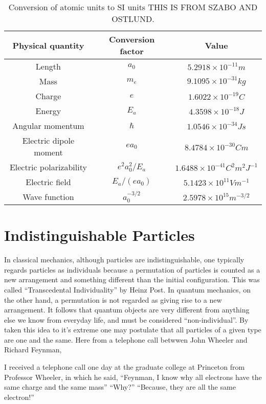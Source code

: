         \begin{table}
            \centering
            \caption{Conversion of atomic units to SI units THIS IS FROM SZABO AND OSTLUND.}
            \begin{tabular}{ccc} \hline
                Physical quantity & Conversion factor & Value \\ \hline
                Length  & $a_0$ & $5.2918 \times 10^{-11} m$ \\
                Mass    & $m_e$ & $9.1095 \times 10^{-31} kg$ \\
                Charge  & $e$   & $1.6022 \times 10^{-19} C$ \\
                Energy  & $E_a$ & $4.3598 \times 10^{-18} J$ \\
                Angular momentum & $\hbar$ &  $1.0546 \times 10^{-34} Js$ \\
                Electric dipole moment & $ea_0$& $8.4784 \times 10^{-30} Cm$ \\
                Electric polarizability & $e^2a_0^2/E_a$ & $1.6488 \times 10^{-41} C^2m^2J^{-1}$ \\
                Electric field & $E_a/(ea_0)$ & $5.1423 \times 10^{11} Vm^{-1} $ \\
                Wave function & $a_0^{-3/2}$ & $2.5978 \times 10^{15} m^{-3/2}$ \\ \hline
            \end{tabular}
            \label{tab:atomic_units_conversion}
        \end{table}


    \section{Indistinguishable Particles}

        In classical mechanics, although particles are indistinguishable, one typically
        regards particles as individuals because a permutation of particles is counted as
        a new arrangement and something different than the initial configuration. 
        This was called ``Transcedental
        Individuality'' by Heinz Post\cite{post1963individuality}. In quantum mechanics, on 
        the other hand, a permutation is not regarded as giving rise to a new 
        arrangement. It follows that quantum objects are very different from anything else we
        know from everyday life, and must be considered ``non-individual''. By taken this idea
        to it's extreme one may postulate that all particles of a given type are one and the
        same. Here from a telephone call betwwen John Wheeler and Richard
        Feynman\cite{feynman1965nobel},
        \begin{displayquote}
             I received a telephone call one day at the graduate college at Princeton from 
            Professor Wheeler, in which he said, ``Feynman, I know why all electrons have
            the same charge and the same mass'' ``Why?'' ``Because, they are all the same 
            electron!''           
        \end{displayquote}

